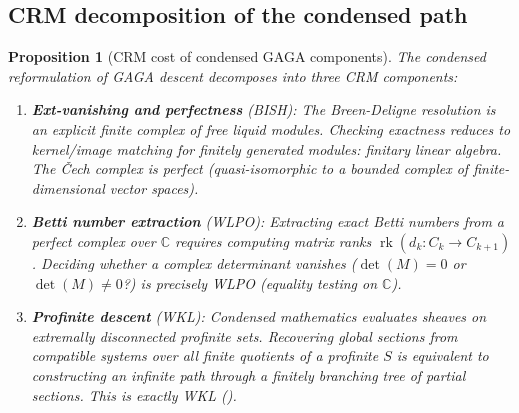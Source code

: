 \documentclass[11pt,a4paper]{article}
\theoremstyle{plain}
\newtheorem{proposition}[theorem]{Proposition}
\theoremstyle{definition}
\newcommand{\BISH}{\textsf{BISH}}
\newcommand{\WKL}{\textsf{WKL}}
\newcommand{\WLPO}{\textsf{WLPO}}
\newcommand{\C}{\mathbb{C}}
\DeclareMathOperator{\rk}{rk}
\begin{document}
\subsection{CRM decomposition of the condensed path}

\begin{proposition}[CRM cost of condensed GAGA components]\label{prop:condensed-crm}
The condensed reformulation of GAGA descent decomposes into three CRM components:
\begin{enumerate}[nosep]
\item \textbf{Ext-vanishing and perfectness} (\BISH): The Breen-Deligne resolution is an explicit finite complex of free liquid modules.
Checking exactness reduces to kernel/image matching for finitely generated modules: finitary linear algebra.
The Čech complex is perfect (quasi-isomorphic to a bounded complex of finite-dimensional vector spaces).

\item \textbf{Betti number extraction} (\WLPO): Extracting exact Betti numbers from a perfect complex over $\C$ requires computing matrix ranks $\rk(d_k : C_k \to C_{k+1})$.
Deciding whether a complex determinant vanishes ($\det(M) = 0$ or $\det(M) \neq 0$?) is precisely \WLPO{} (equality testing on $\C$).

\item \textbf{Profinite descent} (\WKL): Condensed mathematics evaluates sheaves on extremally disconnected profinite sets.
Recovering global sections from compatible systems over all finite quotients of a profinite $S$ is equivalent to constructing an infinite path through a finitely branching tree of partial sections.
This is exactly \WKL{} ().
\end{enumerate}
\end{proposition}
\end{document}
